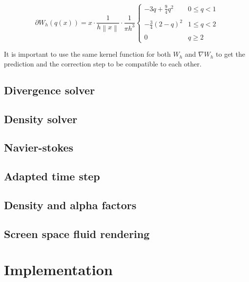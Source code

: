 \documentclass[journal]{vgtc}                %
\begin{document}
    \begin{equation} \label{eq:gradKernel}
        \partial W_h(q(x)) =  x \cdot \frac{1}{h \left \| x \right \|} \cdot \frac{1}{\pi h^3} \left\{\begin{matrix}
        - 3q + \frac{9}{4}q^2 & 0 \leqslant q < 1 \\ 
        \\
        - \frac{3}{4}(2-q)^2 & 1 \leqslant q < 2\\ 
        \\
        0 & q \geqslant 2
      \end{matrix}\right.
    \end{equation}

    It is important to use the same kernel function for both $W_h$ and $\nabla W_h$ to get the prediction and the correction step to be compatible to each other. 


\subsection{Divergence solver}
\subsection{Density solver}

\subsection{Navier-stokes}
\subsection{Adapted time step}
\subsection{Density and alpha factors}
\subsection{Screen space fluid rendering}

\section{Implementation}
 
\end{document}
